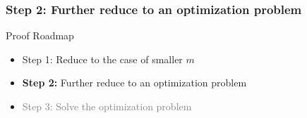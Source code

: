 \documentclass{beamer}
\begin{document}










  



\begin{frame}
  \frametitle{Step 2: Further reduce to an optimization problem}

  Proof Roadmap

  \begin{itemize}
    \item Step 1: Reduce to the case of smaller $m$
    \item \textbf{Step 2:} Further reduce to an optimization problem
    \item \textcolor{gray}{Step 3: Solve the optimization problem}
  \end{itemize}
\end{frame}
\end{document}
